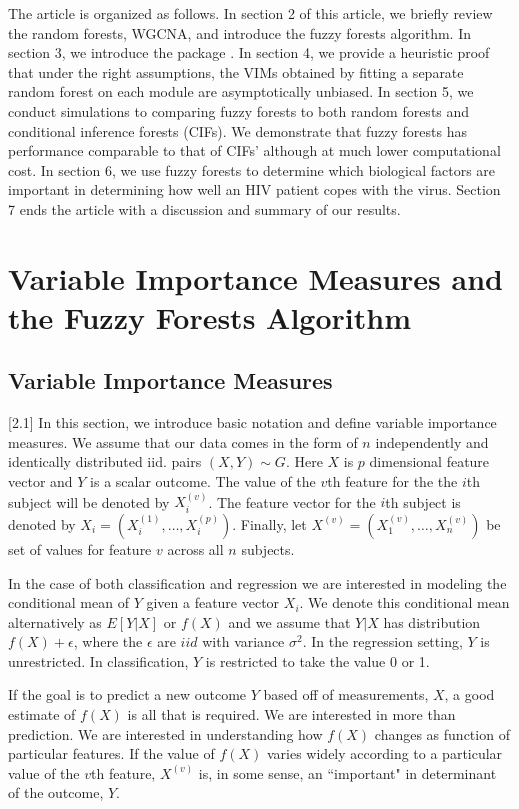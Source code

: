 \documentclass[article,shortnames]{jss}
\begin{document}
The article is organized as follows.  In section 2 of this article, we briefly review the random forests, WGCNA, and introduce the fuzzy forests algorithm.
In section 3, we introduce the  package .  In section 4, we provide a heuristic proof that under the right assumptions, the VIMs obtained by fitting a separate random forest on each module are asymptotically unbiased.  In section 5, we conduct simulations to comparing fuzzy forests to both random forests and conditional inference forests (CIFs).  We demonstrate that fuzzy forests has performance comparable to that of CIFs' although at much lower computational cost.  In section 6, we use fuzzy forests to determine which biological factors are important in determining how well an HIV patient copes with the virus.  Section 7 ends the article with a discussion and summary of our results. 

\section[Fuzzy Forests Algorithm]{Variable Importance Measures and the Fuzzy Forests Algorithm}
\subsection{Variable Importance Measures}[2.1]
In this section, we introduce basic notation and define variable importance measures.  We assume that our data comes in the form of $n$ independently and identically distributed iid.
pairs $(X,Y) \sim G$.  Here $X$ is $p$ dimensional feature vector and $Y$ is a scalar outcome.  The value of the $v$th feature for the the $i$th subject will be denoted by $X_{i}^{(v)}$.
The feature vector for the $i$th subject is denoted by $X_{i}=(X_{i}^{(1)},\ldots,X_{i}^{(p)})$.   Finally, let $X^{(v)}=(X_{1}^{(v)},\ldots,X_{n}^{(v)})$ be set of values for feature $v$ across
all $n$ subjects.

In the case of both classification and regression we are interested in modeling the conditional mean of $Y$ given a feature vector $X_{i}$.  We denote this conditional mean alternatively as $E[Y|X]$ or $f(X)$ and we assume that $Y|X$ has distribution $f(X) + \epsilon$, where the $\epsilon$ are $iid$ with variance $\sigma^{2}$.   In the regression setting, $Y$ is unrestricted. 
In classification, $Y$ is restricted to take the value 0 or 1.  

If the goal is to predict a new outcome $Y$ based off of measurements, $X$, a good estimate of $f(X)$ is all that is required.
We are interested in more than prediction.  We are interested in understanding how $f(X)$ changes as function of particular features. 
If the value of $f(X)$ varies widely according to a particular value of the $v$th feature, $X^{(v)}$ is, in some sense, an ``important" in determinant of
the outcome, $Y$.  
\end{document}
